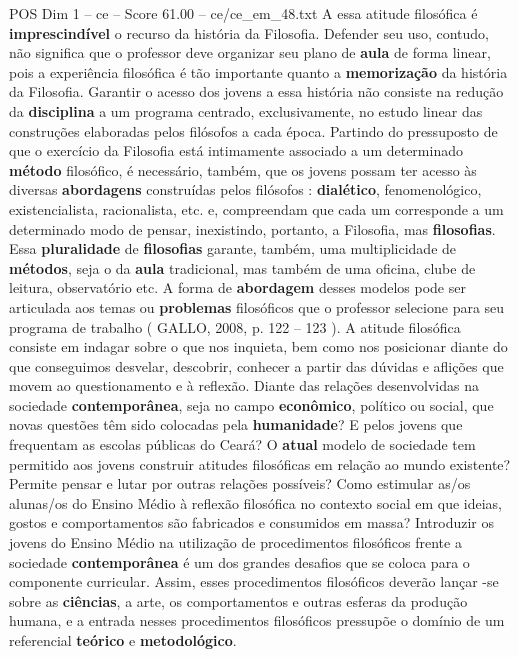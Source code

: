 \begin{textsample}{POS Dim 1 – ce – Score 61.00 – ce/ce\_em\_48.txt}
A essa atitude filosófica é \textbf{imprescindível} o recurso da história da Filosofia.
Defender seu uso, contudo, não significa que o professor deve organizar seu plano de \textbf{aula} de forma linear, pois a experiência filosófica é tão importante quanto a \textbf{memorização} da história da Filosofia.
Garantir o acesso dos jovens a essa história não consiste na redução da \textbf{disciplina} a um programa centrado, exclusivamente, no estudo linear das construções elaboradas pelos filósofos a cada época.
Partindo do pressuposto de que o exercício da Filosofia está intimamente associado a um determinado \textbf{método} filosófico, é necessário, também, que os jovens possam ter acesso às diversas \textbf{abordagens} construídas pelos filósofos : \textbf{dialético}, fenomenológico, existencialista, racionalista, etc. e, compreendam que cada um corresponde a um determinado modo de pensar, inexistindo, portanto, a Filosofia, mas \textbf{filosofias}.
Essa \textbf{pluralidade} de \textbf{filosofias} garante, também, uma multiplicidade de \textbf{métodos}, seja o da \textbf{aula} tradicional, mas também de uma oficina, clube de leitura, observatório etc.
A forma de \textbf{abordagem} desses modelos pode ser articulada aos temas ou \textbf{problemas} filosóficos que o professor selecione para seu programa de trabalho ( GALLO, 2008, p. 122 – 123 ).
A atitude filosófica consiste em indagar sobre o que nos inquieta, bem como nos posicionar diante do que conseguimos desvelar, descobrir, conhecer a partir das dúvidas e aflições que movem ao questionamento e à reflexão.
Diante das relações desenvolvidas na sociedade \textbf{contemporânea}, seja no campo \textbf{econômico}, político ou social, que novas questões têm sido colocadas pela \textbf{humanidade}?
E pelos jovens que frequentam as escolas públicas do Ceará?
O \textbf{atual} modelo de sociedade tem permitido aos jovens construir atitudes filosóficas em relação ao mundo existente?
Permite pensar e lutar por outras relações possíveis?
Como estimular as/os alunas/os do Ensino Médio à reflexão filosófica no contexto social em que ideias, gostos e comportamentos são fabricados e consumidos em massa?
Introduzir os jovens do Ensino Médio na utilização de procedimentos filosóficos frente a sociedade \textbf{contemporânea} é um dos grandes desafios que se coloca para o componente curricular.
Assim, esses procedimentos filosóficos deverão lançar -se sobre as \textbf{ciências}, a arte, os comportamentos e outras esferas da produção humana, e a entrada nesses procedimentos filosóficos pressupõe o domínio de um referencial \textbf{teórico} e \textbf{metodológico}.

\end{textsample}
